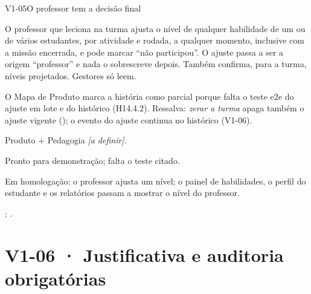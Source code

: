 \begin{resposta}{V1-05}{O professor tem a decisão final}{\implementado}
\begin{campos}
  \item[Existe] O professor que leciona na turma ajusta o nível de qualquer
    habilidade de um ou de vários estudantes, por atividade e rodada, a
    qualquer momento, inclusive com a missão encerrada, e pode marcar ``não
    participou''. O ajuste passa a ser a origem ``professor'' e nada o
    sobrescreve depois. Também confirma, para a turma, níveis projetados.
    Gestores só leem.
  \item[Diferença] O Mapa de Produto marca a história como parcial porque
    falta o teste e2e do ajuste em lote e do histórico (H14.4.2). Ressalva:
    \emph{zerar a turma} apaga também o ajuste vigente ();
    o evento do ajuste continua no histórico (V1-06).
  \item[Responsável] Produto + Pedagogia \textit{[a definir]}.
  \item[Homologação] Pronto para demonstração; falta o teste citado.
  \item[Aceite] Em homologação: o professor ajusta um nível; o painel de
    habilidades, o perfil do estudante e os relatórios passam a mostrar o
    nível do professor.
  \item[Evidência] ;
    .
\end{campos}
\end{resposta}

\section{V1-06 · Justificativa e auditoria obrigatórias}

